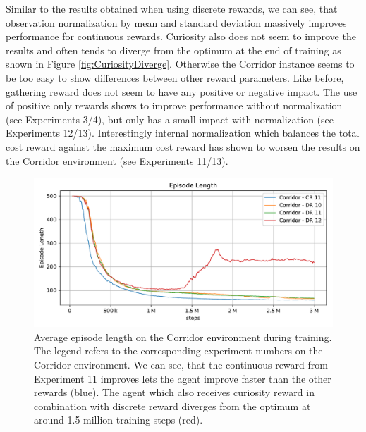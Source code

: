 Similar to the results obtained when using discrete rewards, we can see, that observation normalization by mean and standard deviation massively improves performance for continuous rewards. Curiosity also does not seem to improve the results and often tends to diverge from the optimum at the end of training as shown in Figure \ref{fig:CuriosityDiverge}. Otherwise the Corridor instance seems to be too easy to show differences between other reward parameters. Like before, gathering reward does not seem to have any positive or negative impact. The use of positive only rewards shows to improve performance without normalization (see Experiments 3/4), but only has a small impact with normalization (see Experiments 12/13). Interestingly internal normalization which balances the total cost reward against the maximum cost reward has shown to worsen the results on the Corridor environment (see Experiments 11/13). 


\begin{figure}[htp]
    
    \begin{center}
        \includegraphics[clip, width=0.75\columnwidth]{figures/evaluation/rewards/continuous_vs_discrete.pdf}
    \end{center}
    
    \caption[Training Curves with Curiosity Reward]{Average episode length on the Corridor environment during training. The legend refers to the corresponding experiment numbers on the Corridor environment. We can see, that the continuous reward from Experiment 11 improves lets the agent improve faster than the other rewards (blue). The agent which also receives curiosity reward in combination with discrete reward diverges from the optimum at around 1.5 million training steps (red).}
    \label{fig:ContinuousVsDiscrete}
\end{figure}

